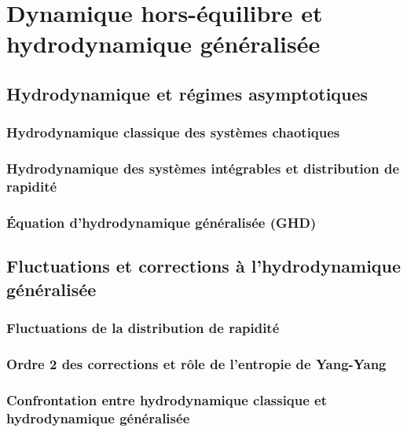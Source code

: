 \part{Dynamique hors-équilibre et hydrodynamique généralisée}

\chapter{Hydrodynamique et régimes asymptotiques}
\minitoc
\section{Hydrodynamique classique des systèmes chaotiques}
\section{Hydrodynamique des systèmes intégrables et distribution de rapidité}
\section{Équation d’hydrodynamique généralisée (GHD)}

\chapter{Fluctuations et corrections à l’hydrodynamique généralisée}
\minitoc
\section{Fluctuations de la distribution de rapidité}

\section{Ordre 2 des corrections et rôle de l’entropie de Yang-Yang}
\section{Confrontation entre hydrodynamique classique et hydrodynamique généralisée}

			            
